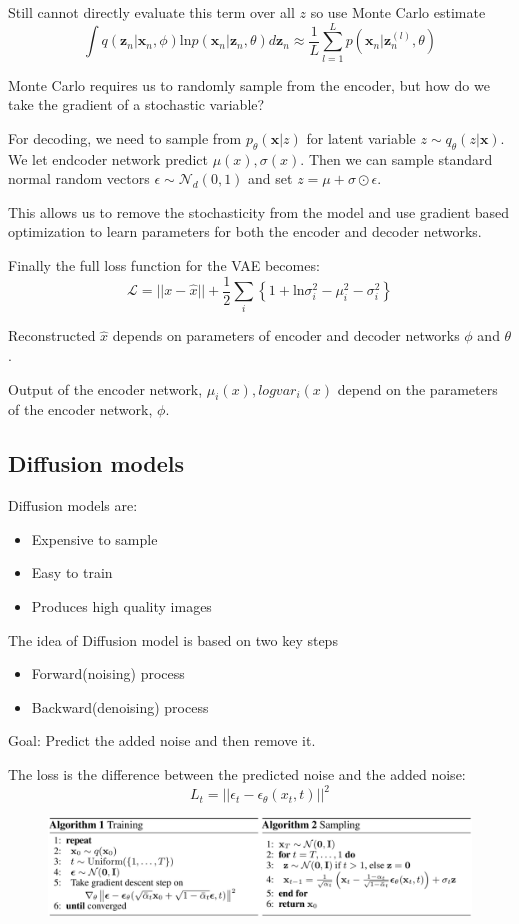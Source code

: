 Still cannot directly evaluate this term over all \(z\) so use Monte Carlo estimate
\[
    \int q(\mathbf{z}_n|\mathbf{x}_n,\phi)  \text{ln}  p(\mathbf{x}_n|\mathbf{z}_n,\theta) d\mathbf{z}_n \approx \frac{1}{L}\sum_{l = 1}^{L} p(\mathbf{x}_n|\mathbf{z}_n^{(l)},\theta)
\]

Monte Carlo requires us to randomly sample from the encoder, but how do we take the gradient of a stochastic variable?

For decoding, we need to sample from \(p_\theta(\mathbf{x}|z)\) for latent variable \(z \sim q_\theta(z|\mathbf{x})\).
We let endcoder network predict \(\mu(x),\sigma(x)\).
Then we can sample standard normal random vectors \(\epsilon \sim \mathcal{N}_d(0,1)\) and set \(z = \mu + \sigma \odot \epsilon\).

This allows us to remove the stochasticity from the model and use gradient based optimization to learn parameters for both the encoder and decoder networks.

Finally the full loss function for the VAE becomes:
\[
\mathcal{L} = ||x-\hat{x}|| + \frac{1}{2}\sum_{i}\left\{ 1 + \text{ln} \sigma_i^2 - \mu_i^2 - \sigma_i^2\right\}
\]

Reconstructed \(\hat{x}\) depends on parameters of encoder and decoder networks \(\phi\) and \(\theta\).

Output of the encoder network, \(\mu_i(x),logvar_i(x)\) depend on the parameters of the encoder network, \(\phi\).

\subsection{Diffusion models}
Diffusion models are:
\begin{itemize}
    \item Expensive to sample
    \item Easy to train
    \item Produces high quality images
\end{itemize}

The idea of Diffusion model is based on two key steps
\begin{itemize}
    \item Forward(noising) process 
    \item Backward(denoising) process
\end{itemize}
Goal: Predict the added noise and then remove it.

The loss is the difference between the predicted noise and the added noise:
\[
L_t = ||\epsilon_t-\epsilon_\theta(x_t,t)||^2
\]

\begin{figure}[!h]
    \includegraphics[width = \columnwidth]{figures/GenAI2/DiffusionAlgorithm.png}
\end{figure}